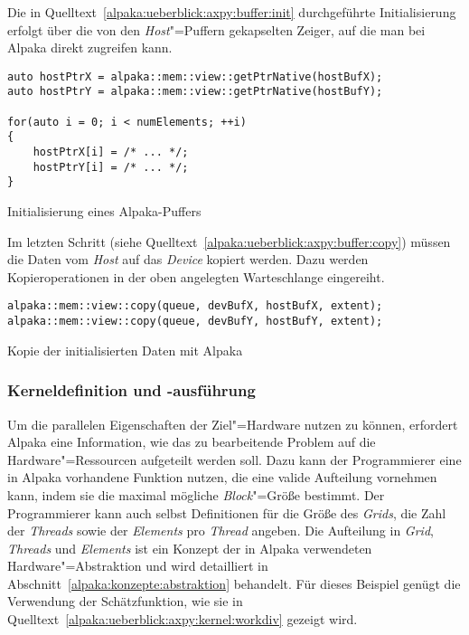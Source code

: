 Die in Quelltext~\ref{alpaka:ueberblick:axpy:buffer:init} durchgeführte
Initialisierung erfolgt über die von den \textit{Host}"=Puffern gekapselten
Zeiger, auf die man bei Alpaka direkt zugreifen kann.

\begin{code}
    \begin{verbatim}
auto hostPtrX = alpaka::mem::view::getPtrNative(hostBufX);
auto hostPtrY = alpaka::mem::view::getPtrNative(hostBufY);

for(auto i = 0; i < numElements; ++i)
{
    hostPtrX[i] = /* ... */;
    hostPtrY[i] = /* ... */;
}
    \end{verbatim}
    \caption{Initialisierung eines Alpaka-Puffers}
    \label{alpaka:ueberblick:axpy:buffer:init}
\end{code}

Im letzten Schritt (siehe Quelltext~\ref{alpaka:ueberblick:axpy:buffer:copy})
müssen die Daten vom \textit{Host} auf das \textit{Device} kopiert werden. Dazu
werden Kopieroperationen in der oben angelegten Warteschlange eingereiht.

\begin{code}
    \begin{verbatim}
alpaka::mem::view::copy(queue, devBufX, hostBufX, extent);
alpaka::mem::view::copy(queue, devBufY, hostBufY, extent);
    \end{verbatim}
    \caption{Kopie der initialisierten Daten mit Alpaka}
    \label{alpaka:ueberblick:axpy:buffer:copy}
\end{code}

\subsubsection{Kerneldefinition und -ausführung}
\label{alpaka:ueberblick:axpy:kernel}

Um die parallelen Eigenschaften der Ziel"=Hardware nutzen zu können, erfordert
Alpaka eine Information, wie das zu bearbeitende Problem auf die
Hardware"=Ressourcen aufgeteilt werden soll. Dazu kann der Programmierer eine
in Alpaka vorhandene Funktion nutzen, die eine valide Aufteilung vornehmen kann,
indem sie die maximal mögliche \textit{Block}"=Größe bestimmt. Der Programmierer
kann auch selbst Definitionen für die Größe des \textit{Grids}, die Zahl der
\textit{Threads} sowie der \textit{Elements} pro \textit{Thread} angeben. Die
Aufteilung in \textit{Grid}, \textit{Threads} und \textit{Elements} ist ein
Konzept der in Alpaka verwendeten Hardware"=Abstraktion und wird detailliert in
Abschnitt~\ref{alpaka:konzepte:abstraktion} behandelt. Für dieses Beispiel
genügt die Verwendung der Schätzfunktion, wie sie in
Quelltext~\ref{alpaka:ueberblick:axpy:kernel:workdiv} gezeigt wird.

